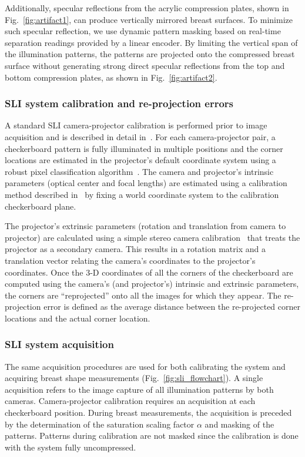 Additionally, specular reflections from the acrylic compression plates, shown in Fig.~\ref{fig:artifact1}, can produce vertically mirrored breast surfaces. To minimize such specular reflection, we use dynamic pattern masking based on real-time separation readings provided by a linear encoder. By limiting the vertical span of the illumination patterns, the patterns are projected onto the compressed breast surface without generating strong direct specular reflections from the top and bottom compression plates, as shown in Fig.~\ref{fig:artifact2}.

\subsubsection{SLI system calibration and re-projection errors}
A standard SLI camera-projector calibration is performed prior to image acquisition and is described in detail in~\cite{Moreno2012}. For each camera-projector pair, a checkerboard pattern is fully illuminated in multiple positions and the corner locations are estimated in the projector's default coordinate system using a robust pixel classification algorithm~\cite{Xu2007}. The camera and projector's intrinsic parameters (optical center and focal lengths) are estimated using a calibration method described in~\cite{Zhang2000} by fixing a world coordinate system to the calibration checkerboard plane. 

The projector's extrinsic parameters (rotation and translation from camera to projector) are calculated using a simple stereo camera calibration~\cite{Bouguet2004} that treats the projector as a secondary camera. This results in a rotation matrix and a translation vector relating the camera's coordinates to the projector's coordinates. Once the 3-D coordinates of all the corners of the checkerboard are computed using the camera's (and projector's) intrinsic and extrinsic parameters, the corners are ``reprojected'' onto all the images for which they appear. The re-projection error is defined as the average distance between the re-projected corner locations and the actual corner location. 

\subsubsection{SLI system acquisition}
The same acquisition procedures are used for both calibrating the system and acquiring breast shape measurements (Fig.~\ref{fig:sli_flowchart}). A single acquisition refers to the image capture of all illumination patterns by both cameras. Camera-projector calibration requires an acquisition at each checkerboard position. During breast measurements, the acquisition is preceded by the determination of the saturation scaling factor $\alpha$ and masking of the patterns. Patterns during calibration are not masked since the calibration is done with the system fully uncompressed. 

